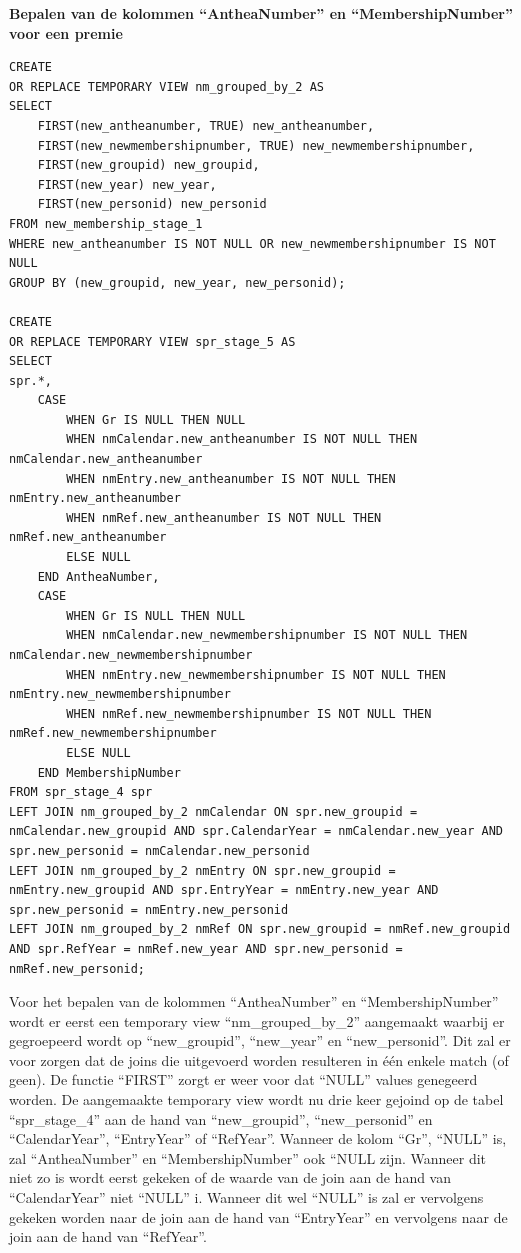 \textbf{Bepalen van de kolommen ``AntheaNumber'' en ``MembershipNumber'' voor een premie}

\begin{verbatim}
CREATE
OR REPLACE TEMPORARY VIEW nm_grouped_by_2 AS
SELECT 
    FIRST(new_antheanumber, TRUE) new_antheanumber,
    FIRST(new_newmembershipnumber, TRUE) new_newmembershipnumber,
    FIRST(new_groupid) new_groupid, 
    FIRST(new_year) new_year,
    FIRST(new_personid) new_personid
FROM new_membership_stage_1
WHERE new_antheanumber IS NOT NULL OR new_newmembershipnumber IS NOT NULL
GROUP BY (new_groupid, new_year, new_personid);

CREATE 
OR REPLACE TEMPORARY VIEW spr_stage_5 AS 
SELECT
spr.*,
    CASE
        WHEN Gr IS NULL THEN NULL
        WHEN nmCalendar.new_antheanumber IS NOT NULL THEN nmCalendar.new_antheanumber
        WHEN nmEntry.new_antheanumber IS NOT NULL THEN nmEntry.new_antheanumber
        WHEN nmRef.new_antheanumber IS NOT NULL THEN nmRef.new_antheanumber
        ELSE NULL
    END AntheaNumber,
    CASE
        WHEN Gr IS NULL THEN NULL
        WHEN nmCalendar.new_newmembershipnumber IS NOT NULL THEN nmCalendar.new_newmembershipnumber
        WHEN nmEntry.new_newmembershipnumber IS NOT NULL THEN nmEntry.new_newmembershipnumber
        WHEN nmRef.new_newmembershipnumber IS NOT NULL THEN nmRef.new_newmembershipnumber
        ELSE NULL
    END MembershipNumber
FROM spr_stage_4 spr
LEFT JOIN nm_grouped_by_2 nmCalendar ON spr.new_groupid = nmCalendar.new_groupid AND spr.CalendarYear = nmCalendar.new_year AND spr.new_personid = nmCalendar.new_personid
LEFT JOIN nm_grouped_by_2 nmEntry ON spr.new_groupid = nmEntry.new_groupid AND spr.EntryYear = nmEntry.new_year AND spr.new_personid = nmEntry.new_personid  
LEFT JOIN nm_grouped_by_2 nmRef ON spr.new_groupid = nmRef.new_groupid AND spr.RefYear = nmRef.new_year AND spr.new_personid = nmRef.new_personid;
\end{verbatim}

Voor het bepalen van de kolommen ``AntheaNumber'' en ``MembershipNumber'' wordt er eerst een temporary view ``nm\_grouped\_by\_2'' aangemaakt waarbij er gegroepeerd wordt op ``new\_groupid'', ``new\_year'' en ``new\_personid''. Dit zal er voor zorgen dat de joins die uitgevoerd worden resulteren in één enkele match (of geen). De functie ``FIRST'' zorgt er weer voor dat ``NULL'' values genegeerd worden. De aangemaakte temporary view wordt nu drie keer gejoind op de tabel ``spr\_stage\_4'' aan de hand van ``new\_groupid'', ``new\_personid'' en ``CalendarYear'', ``EntryYear'' of ``RefYear''. Wanneer de kolom ``Gr'', ``NULL'' is, zal ``AntheaNumber'' en ``MembershipNumber'' ook ``NULL zijn. Wanneer dit niet zo is wordt eerst gekeken of de waarde van de join aan de hand van ``CalendarYear'' niet ``NULL'' i. Wanneer dit wel ``NULL'' is zal er vervolgens gekeken worden naar de join aan de hand van ``EntryYear'' en vervolgens naar de join aan de hand van ``RefYear''.

